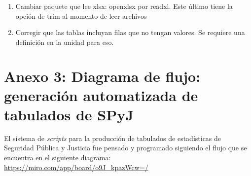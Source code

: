 \documentclass[
  spanish,
]{book}
\begin{document}
\begin{enumerate}
\def\labelenumi{\arabic{enumi}.}
\item
  Cambiar paquete que lee xlsx: openxlsx por readxl. Este último tiene la opción de trim al momento de leer archivos
\item
  Corregir que las tablas incluyan filas que no tengan valores. Se requiere una definición en la unidad para eso.
\end{enumerate}

\hypertarget{anexo-3-diagrama-de-flujo-generaciuxf3n-automatizada-de-tabulados-de-spyj}{%
\chapter*{Anexo 3: Diagrama de flujo: generación automatizada de tabulados de SPyJ}\label{anexo-3-diagrama-de-flujo-generaciuxf3n-automatizada-de-tabulados-de-spyj}}

El sistema de \emph{scripts} para la producción de tabulados de estadísticas de Seguridad Pública y Justicia fue pensado y programado siguiendo el flujo que se encuentra en el siguiente diagrama: \url{https://miro.com/app/board/o9J_kpazWcw=/}

  
\end{document}
